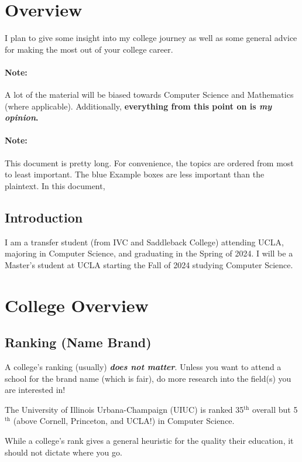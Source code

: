 \documentclass[12pt]{article}
\newenvironment{example}{
\begin{tcolorbox}[title=Example, colback=blue!5!white, colframe=black!75!blue]
}{ \end{tcolorbox} }
\renewcommand{\it}[1]{\textit{{#1}}}
\renewcommand{\bf}[1]{\textbf{{#1}}}
\newcommand{\ib}[1]{\textit{\textbf{{#1}}}}
\renewcommand{\th}{$^{\text{th}}$ }
\begin{document}
\tableofcontents
\newpage

\section{Overview}
\label{sec:overview}
I plan to give some insight into my college journey as well as some general
advice for making the most out of your college career.

\paragraph{Note:} A lot of the material will be biased towards Computer Science
and Mathematics (where applicable). Additionally, \bf{everything from this point
on is \it{my opinion}.}

\paragraph{Note:} This document is pretty long. For convenience, the topics are
ordered from most to least important. The blue Example boxes are less important
than the plaintext. In this document,

\subsection{Introduction}
I am a transfer student (from IVC and Saddleback College) attending UCLA,
majoring in Computer Science, and graduating in the Spring of 2024. I will be a
Master's student at UCLA starting the Fall of 2024 studying Computer Science.

\section{College Overview}

\subsection{Ranking (Name Brand)}
A college's ranking (usually) \ib{does not matter}. Unless you want to attend a
school for the brand name (which is fair), do more research into the field(s)
you are interested in!
\begin{example}
  The University of Illinois Urbana-Champaign (UIUC) is ranked 35\th overall
  but 5\th (above Cornell, Princeton, and UCLA!) in Computer Science.
\end{example}

While a college's rank gives a general heuristic for the quality their
education, it should not dictate where you go.
\end{document}
